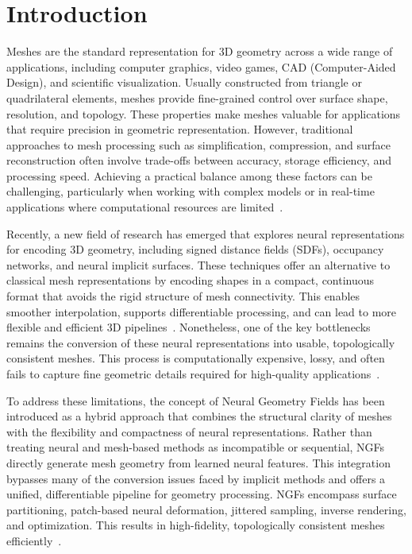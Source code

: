 \section{Introduction}

Meshes are the standard representation for 3D geometry across a wide range of applications, including computer graphics, video games, CAD (Computer-Aided Design), and scientific visualization.  
Usually constructed from triangle or quadrilateral elements, meshes provide fine-grained control over surface shape, resolution, and topology.  
These properties make meshes valuable for applications that require precision in geometric representation.  
However, traditional approaches to mesh processing such as simplification, compression, and surface reconstruction often involve trade-offs between accuracy, storage efficiency, and processing speed.  
Achieving a practical balance among these factors can be challenging, particularly when working with complex models or in real-time applications where computational resources are limited~\cite{maglo2015}.  

Recently, a new field of research has emerged that explores neural representations for encoding 3D geometry, including signed distance fields (SDFs), occupancy networks, and neural implicit surfaces.  
These techniques offer an alternative to classical mesh representations by encoding shapes in a compact, continuous format that avoids the rigid structure of mesh connectivity.  
This enables smoother interpolation, supports differentiable processing, and can lead to more flexible and efficient 3D pipelines~\cite{park2019}.  
Nonetheless, one of the key bottlenecks remains the conversion of these neural representations into usable, topologically consistent meshes.  
This process is computationally expensive, lossy, and often fails to capture fine geometric details required for high-quality applications~\cite{sivaram2024}.  

To address these limitations, the concept of Neural Geometry Fields has been introduced as a hybrid approach that combines the structural clarity of meshes with the flexibility and compactness of neural representations.  
Rather than treating neural and mesh-based methods as incompatible or sequential, NGFs directly generate mesh geometry from learned neural features.  
This integration bypasses many of the conversion issues faced by implicit methods and offers a unified, differentiable pipeline for geometry processing.  
NGFs encompass surface partitioning, patch-based neural deformation, jittered sampling, inverse rendering, and optimization.  
This results in high-fidelity, topologically consistent meshes efficiently~\cite{sivaram2024}.  


